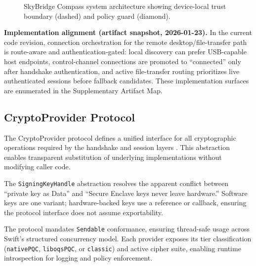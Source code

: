 \documentclass[10pt,journal,compsoc]{IEEEtran}
\begin{document}
\begin{figure}[!t]
\caption{SkyBridge Compass system architecture showing device-local trust
boundary (dashed) and policy guard (diamond).}
\label{fig:architecture}
\end{figure}

\textbf{Implementation alignment (artifact snapshot, 2026-01-23).} In the
current code revision, connection orchestration for the remote
desktop/file-transfer path is route-aware and authentication-gated:
local discovery can prefer USB-capable host endpoints, control-channel
connections are promoted to ``connected'' only after handshake
authentication, and active file-transfer routing prioritizes live
authenticated sessions before fallback candidates. These implementation
surfaces are enumerated in the Supplementary Artifact Map.

\subsection{CryptoProvider
Protocol}\label{b.-cryptoprovider-protocol}

The CryptoProvider protocol defines a unified interface for all
cryptographic operations required by the handshake and session layers \cite{ref37}.
This abstraction enables transparent substitution of underlying
implementations without modifying caller code.


The \texttt{SigningKeyHandle} abstraction resolves the apparent conflict
between ``private key as Data'' and ``Secure Enclave keys never leave
hardware.'' Software keys are one variant; hardware-backed keys use a
reference or callback, ensuring the protocol interface does not assume
exportability.

The protocol mandates \texttt{Sendable} conformance, ensuring
thread-safe usage across Swift's structured concurrency model. Each
provider exposes its tier classification (\texttt{nativePQC},
\texttt{liboqsPQC}, or \texttt{classic}) and active cipher suite,
enabling runtime introspection for logging and policy enforcement.
\end{document}
